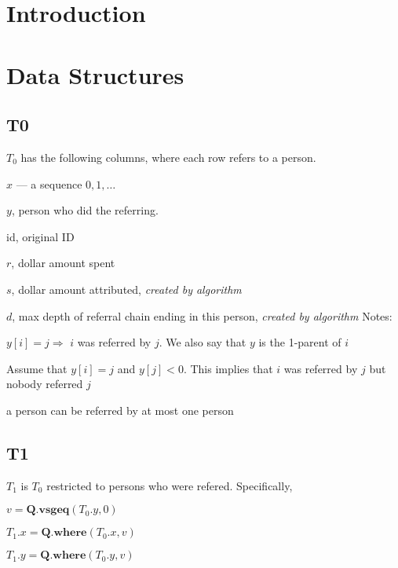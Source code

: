 \section{Introduction}

\TBC

\section{Data Structures}
\subsection{T0}

\(T_0\) has the following columns, where each row refers to a person.
\be
\item \(x\) --- a sequence \(0, 1, \ldots\)
\item \(y\), person who did the referring. 
\item id, original ID 
\item \(r\), dollar amount spent 
\item \(s\), dollar amount attributed, {\em created by algorithm}
\item \(d\), max depth of referral chain ending in this person, {\em created by algorithm}
\ee
Notes:
\bi
\item \(y[i] = j \Rightarrow\) \(i\) was referred by \(j\). 
We also say that \(y\) is the 1-parent of \(i\)
\item 
Assume that \(y[i] = j\) and \(y[j] < 0\). 
This implies that \(i\) was referred by \(j\) but nobody referred \(j\)
\item a person can be referred by at most one person 
\ei

\subsection{T1}

\(T_1\) is \(T_0\) restricted to persons who were refered. Specifically,
\bi
\item \(v = \mathbf{Q.vsgeq}(T_0.y, 0)\)
\item \(T_1.x = \mathbf{Q.where}(T_0.x, v)\)
\item \(T_1.y = \mathbf{Q.where}(T_0.y, v)\)
\ei


